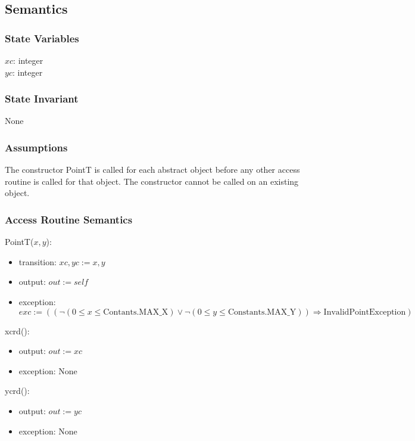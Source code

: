 \documentclass[12pt]{article}
\begin{document}
\subsection* {Semantics}

\subsubsection* {State Variables}

$xc$: integer\\
$yc$: integer

\subsubsection* {State Invariant}

None

\subsubsection* {Assumptions}
The constructor PointT is called for each abstract object before any other access routine is called for that
object.  The constructor cannot be called on an existing object.

\subsubsection* {Access Routine Semantics}

PointT($x, y$):
\begin{itemize}
\item transition: $xc, yc := x, y$
\item output: $out := \mathit{self}$
\item exception:
 $exc := ((\neg(0 \leq x \leq \mbox{Contants.MAX\_X}) \vee \neg(0 \leq y \leq \mbox{Constants.MAX\_Y})) \Rightarrow
\mbox{InvalidPointException})$
\end{itemize}

\noindent xcrd():
\begin{itemize}
\item output: $out := xc$
\item exception: None
\end{itemize}

\noindent ycrd():
\begin{itemize}
\item output: $out := yc$
\item exception: None
\end{itemize}
\end{document}
